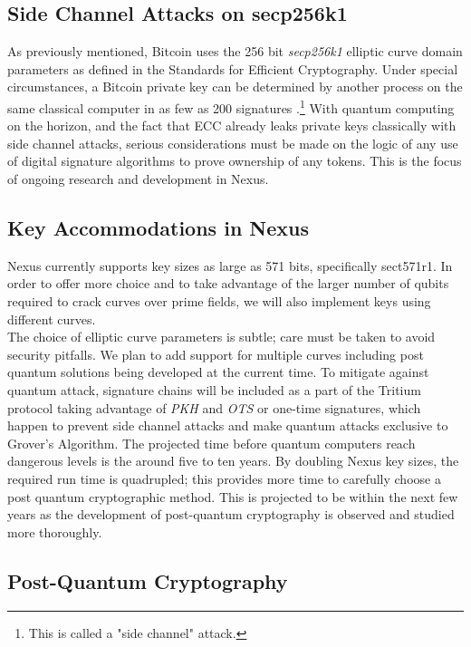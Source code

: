 \documentclass[11pt]{article}
\begin{document}
\subsection{Side Channel Attacks on secp256k1}

As previously mentioned, Bitcoin uses the 256 bit \textit{secp256k1} elliptic curve domain parameters as defined in the Standards for Efficient Cryptography.
Under special circumstances, a Bitcoin private key can be determined by another process on the same classical computer in as few as 200 signatures \cite{sigleak}.\footnote{This is called a "side channel" attack.}
With quantum computing on the horizon, and the fact that ECC already leaks private keys classically with side channel attacks, serious considerations must be made on the logic of any use of digital signature algorithms to prove ownership of any tokens.
This is the focus of ongoing research and development in Nexus.

\subsection{Key Accommodations in Nexus} 

Nexus currently supports key sizes as large as 571 bits, specifically sect571r1.
In order to offer more choice and to take advantage of the larger number of qubits required to crack curves over prime fields, we will also implement keys using different curves.\\

\noindent The choice of elliptic curve parameters is subtle; care must be taken to avoid security pitfalls.
We plan to add support for multiple curves including post quantum solutions being developed at the current time.
To mitigate against quantum attack, signature chains will be included as a part of the Tritium protocol taking advantage of \textit{PKH} and \textit{OTS} or one-time signatures, which happen to prevent side channel attacks and make quantum attacks exclusive to Grover's Algorithm.
The projected time before quantum computers reach dangerous levels is the around five to ten years.
By doubling Nexus key sizes, the required run time is quadrupled; this provides more time to carefully choose a post quantum cryptographic method. 
This is projected to be within the next few years as the development of post-quantum cryptography is observed and studied more thoroughly.

\subsection{Post-Quantum Cryptography}
\end{document}
